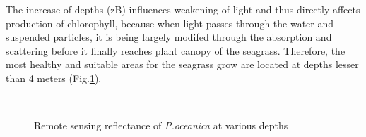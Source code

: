 \documentclass[10pt, a4paper]{article}
\begin{document}
The increase of depths (zB) influences weakening of light and thus directly affects
production of chlorophyll, because when light passes through the water and suspended particles, it is
being largely modifed through the absorption and scattering before it finally reaches plant canopy of
the seagrass. Therefore, the most healthy and suitable areas for the seagrass grow are located at depths
lesser than 4 meters (Fig.\ref{fig:4.9}).

\begin{figure}[H]
	\centering
	\\
	\caption{Remote sensing reflectance of \textit{P.oceanica} at various depths}
	\label{fig:4.9}
\end{figure}
\end{document}
